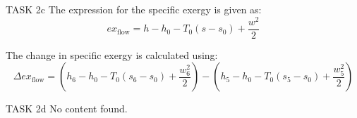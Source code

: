 TASK 2c  
The expression for the specific exergy is given as:  
\[
ex_{\text{flow}} = h - h_0 - T_0(s - s_0) + \frac{w^2}{2}
\]

The change in specific exergy is calculated using:  
\[
\Delta ex_{\text{flow}} = \left(h_6 - h_0 - T_0(s_6 - s_0) + \frac{w_6^2}{2}\right) - \left(h_5 - h_0 - T_0(s_5 - s_0) + \frac{w_5^2}{2}\right)
\]

TASK 2d  
No content found.